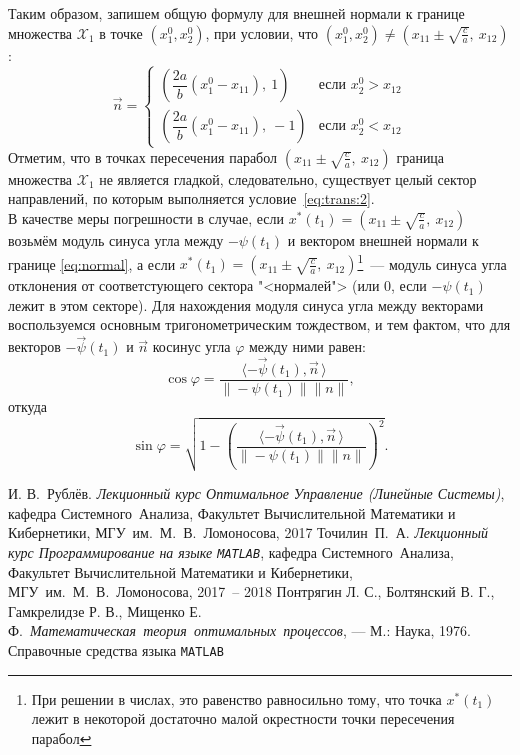 \documentclass[11pt, oneside, final]{article}
\theoremstyle{break}
\numberwithin{equation}{section}
\theoremstyle{plain}
\theoremstyle{definition}
\newcommand{\scalar}[2]{\langle #1, #2\,\rangle}
\begin{document}
    Таким образом, запишем общую формулу для внешней нормали к границе множества \(\mathcal{X}_1\) в точке \(\left(x_1^0, x_2^0\right)\), при условии, что \(\left(x_1^0, x_2^0\right) \neq \left(x_{11} \pm \sqrt{\frac{c}{a}}, \: x_{12} \right)\):
    \begin{equation}
        \label{eq:normal}
        \vec n =
        \begin{cases}
            \left( \dfrac{2a}{b} (x_1^0 - x_{11}), \: 1 \right)& \text{если } x_2^0 > x_{12} \\
            \left( \dfrac{2a}{b} (x_1^0 - x_{11}), \: -1 \right)& \text{если } x_2^0 < x_{12}
        \end{cases}
    \end{equation}
    Отметим, что в точках пересечения парабол \(\left(x_{11} \pm \sqrt{\frac{c}{a}}, \: x_{12} \right)\) граница множества \(\mathcal{X}_1\) не является гладкой, следовательно, существует целый сектор направлений, по которым выполняется условие~\eqref{eq:trans:2}. \\
    В качестве меры погрешности в случае, если \(x^{*}(t_1) = \left(x_{11} \pm \sqrt{\frac{c}{a}}, \: x_{12} \right)\) возьмём модуль синуса угла между \(-\psi(t_1) \) и вектором внешней нормали к границе \eqref{eq:normal}, а если \(x^{*}(t_1) = \left(x_{11} \pm \sqrt{\frac{c}{a}}, \: x_{12} \right)\)\footnote{При решении в числах, это равенство равносильно тому, что точка \(x^{*}(t_1)\) лежит в некоторой достаточно малой окрестности точки пересечения парабол}~--- модуль синуса угла отклонения от соответстующего сектора "<нормалей"> (или 0, если \(-\psi(t_1)\) лежит в этом секторе). Для нахождения модуля синуса угла между векторами воспользуемся основным тригонометрическим тождеством, и тем фактом, что для векторов \(- \vec\psi(t_1) \text{ и } \vec n  \) косинус угла \(\varphi\) между ними равен: 
    \[\cos\varphi = \dfrac{\scalar{- \vec\psi(t_1)}{\vec n}}{\|-\psi(t_1)\| \|n\|}, \]
    откуда 
    \[\sin\varphi = \sqrt{1 - \left(\dfrac{\scalar{- \vec\psi(t_1)}{\vec n}}{\|-\psi(t_1)\| \|n\|}\right)^2}.\]
    
    \begin{thebibliography}{0}
         И. В.~Рублёв. \emph{Лекционный курс Оптимальное Управление (Линейные Системы)},
        кафедра Системного~Анализа, Факультет Вычислительной Математики и Кибернетики, МГУ~им.~М.~В.~Ломоносова, 
        2017
         Точилин~П.~А. \emph{Лекционный курс Программирование на языке \texttt{MATLAB}},
        кафедра Системного~Анализа, Факультет Вычислительной Математики и Кибернетики, МГУ~им.~М.~В.~Ломоносова, 
        2017~-- 2018
         Понтрягин Л. С., Болтянский В. Г., Гамкрелидзе Р. В., Мищенко Е. Ф.~\emph{Математическая~теория~оптимальных~процессов}, — М.: Наука, 1976.
         Справочные средства языка \texttt{MATLAB}
    \end{thebibliography}
\end{document}
